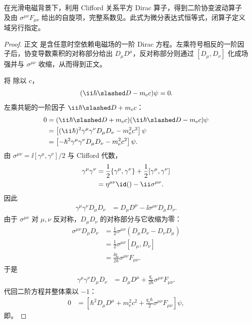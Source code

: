 \begin{proposition}
在光滑电磁背景下，利用 Clifford 关系平方 Dirac 算子，得到二阶协变波动算子及由 $\sigma^{\mu\nu}F_{\mu\nu}$ 给出的自旋项，完整系数见。此式为微分表达式恒等式，闭算子定义域另行指定。
\end{proposition}
\begin{proof}
正文 是含任意时空依赖电磁场的一阶 Dirac 方程。左乘符号相反的一阶因子后，协变导数乘积的对称部分给出 $D_\mu D^\mu$，反对称部分则通过 $[D_\mu,D_\nu]$ 化成场强并与 $\sigma^{\mu\nu}$ 收缩，从而得到正文。


将  除以 $c$，
\begin{equation*}
 (\ii\hbar\slashed D-m_{\mathrm e} c)\psi=0.
\end{equation*}
左乘共轭的一阶因子 $\ii\hbar\slashed D+m_{\mathrm e} c$：
\begin{align*}
 0
 &=(\ii\hbar\slashed D+m_{\mathrm e} c)(\ii\hbar\slashed D-m_{\mathrm e} c)\psi\\
 &=\left[(\ii\hbar)^2\gamma^\mu\gamma^\nu D_\mu D_\nu-m_{\mathrm e}^2c^2\right]\psi\\
 &=\left[-\hbar^2\gamma^\mu\gamma^\nu D_\mu D_\nu-m_{\mathrm e}^2c^2\right]\psi.
\end{align*}
由 $\sigma^{\mu\nu}=\ii[\gamma^\mu,\gamma^\nu]/2$ 与 Clifford 代数，
\begin{align*}
 \gamma^\mu\gamma^\nu
 &=\frac12\{\gamma^\mu,\gamma^\nu\}
 +\frac12[\gamma^\mu,\gamma^\nu]\\
 &=\eta^{\mu\nu}\id()-\ii\sigma^{\mu\nu}.
\end{align*}
因此
\begin{align*}
 \gamma^\mu\gamma^\nu D_\mu D_\nu
 &=D_\mu D^\mu-\ii\sigma^{\mu\nu}D_\mu D_\nu.
\end{align*}
由于 $\sigma^{\mu\nu}$ 对 $\mu,\nu$ 反对称，$D_\mu D_\nu$ 的对称部分与它收缩为零：
\begin{align*}
 \sigma^{\mu\nu}D_\mu D_\nu
 &=\frac12\sigma^{\mu\nu}
 (D_\mu D_\nu-D_\nu D_\mu)\\
 &=\frac12\sigma^{\mu\nu}[D_\mu,D_\nu]\\
 &=\frac{\ii q_{\mathrm e}}{2\hbar}\sigma^{\mu\nu}F_{\mu\nu}.
\end{align*}
于是
\begin{align*}
 \gamma^\mu\gamma^\nu D_\mu D_\nu
 &=D_\mu D^\mu
 +\frac{q_{\mathrm e}}{2\hbar}\sigma^{\mu\nu}F_{\mu\nu}.
\end{align*}
代回二阶方程并整体乘以 $-1$：
\begin{align*}
 0
 &=\left[
 \hbar^2D_\mu D^\mu+m_{\mathrm e}^2c^2
 +\frac{q_{\mathrm e}\hbar}{2}\sigma^{\mu\nu}F_{\mu\nu}
 \right]\psi,
\end{align*}
即。
\end{proof}

